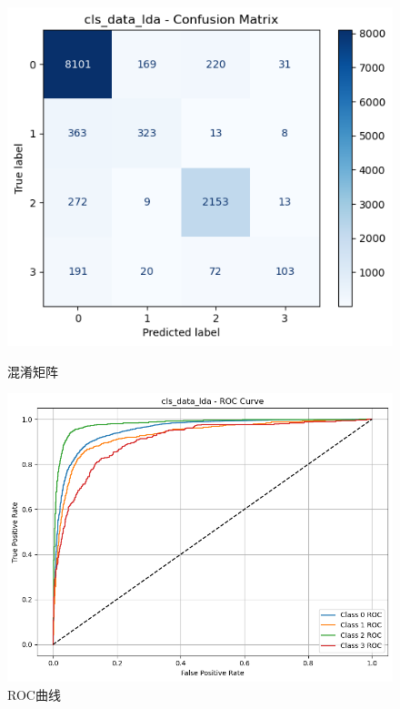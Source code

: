 \documentclass[10pt]{article}
\begin{document}
\begin{figure}[H]
\centering
\begin{minipage}[t]{0.45\textwidth}
  \centering
  \includegraphics[width=\linewidth]{cls_log_lda1.png}
  \caption{混淆矩阵}
  \label{fig:35}
\end{minipage}
\hfill
\begin{minipage}[t]{0.52\textwidth}
  \centering
  \includegraphics[width=\linewidth]{cls_log_lda2.png}
  \caption{ROC曲线}
  \label{fig:36}
\end{minipage}
\end{figure}
\end{document}
